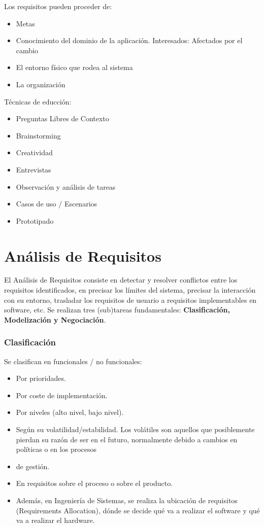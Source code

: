 Los requisitos pueden proceder de:
\begin{itemize}[noitemsep]
\item Metas
\item Conocimiento del dominio de la aplicación. Interesados: Afectados por el cambio
\item El entorno físico que rodea al sistema
\item La organización
\end{itemize}

Técnicas de educción:
\begin{itemize}[noitemsep]
\item Preguntas Libres de Contexto
\item Brainstorming
\item Creatividad
\item Entrevistas
\item Observación y análisis de tareas
\item Casos de uso / Escenarios
\item Prototipado
\end{itemize}

\section{Análisis de Requisitos}
\label{sec:requisitos:analisis}

El Análisis de Requisitos consiste en detectar y resolver conflictos
entre los requisitos identificados, en precisar los límites del
sistema, precisar la interacción con su entorno, trasladar los
requisitos de usuario a requisitos implementables en software, etc. Se
realizan tres (sub)tareas fundamentales: \textbf{Clasificación, Modelización y
Negociación}.

\subsubsection{Clasificación}
\label{sec:requisitos:analisis:clasificacion}

Se clasifican en funcionales / no funcionales:
\begin{itemize}[noitemsep]
\item Por prioridades.
\item Por coste de implementación.
\item Por niveles (alto nivel, bajo nivel).
\item Según su volatilidad/estabilidad. Los volátiles son aquellos que
  posiblemente pierdan su razón de ser en el futuro, normalmente
  debido a cambios en políticas o en los procesos
\item de gestión.
\item En requisitos sobre el proceso o sobre el producto.
\item Además, en Ingeniería de Sistemas, se realiza la ubicación de
  requisitos (Requirements Allocation), dónde se decide qué va a
  realizar el software y qué va a realizar el hardware.
\end{itemize}

